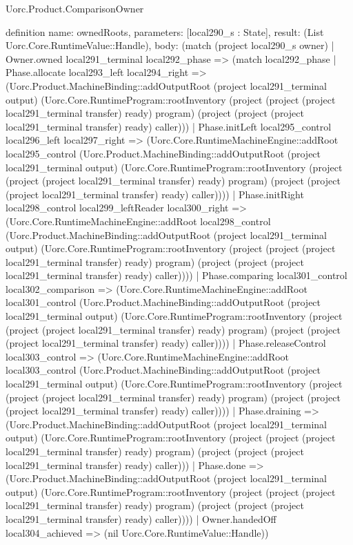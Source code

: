 \begin{lexlean}{Uorc.Product.ComparisonOwner}
\begin{semanticmodule}
definition{
  name: ownedRoots,
  parameters: [local290_s : State],
  result: (List Uorc.Core.RuntimeValue::Handle),
  body: (match (project local290_s owner)
    | Owner.owned local291_terminal local292_phase => (match local292_phase
      | Phase.allocate local293_left local294_right => (Uorc.Product.MachineBinding::addOutputRoot (project local291_terminal output) (Uorc.Core.RuntimeProgram::rootInventory (project (project (project local291_terminal transfer) ready) program) (project (project (project local291_terminal transfer) ready) caller)))
      | Phase.initLeft local295_control local296_left local297_right => (Uorc.Core.RuntimeMachineEngine::addRoot local295_control (Uorc.Product.MachineBinding::addOutputRoot (project local291_terminal output) (Uorc.Core.RuntimeProgram::rootInventory (project (project (project local291_terminal transfer) ready) program) (project (project (project local291_terminal transfer) ready) caller))))
      | Phase.initRight local298_control local299_leftReader local300_right => (Uorc.Core.RuntimeMachineEngine::addRoot local298_control (Uorc.Product.MachineBinding::addOutputRoot (project local291_terminal output) (Uorc.Core.RuntimeProgram::rootInventory (project (project (project local291_terminal transfer) ready) program) (project (project (project local291_terminal transfer) ready) caller))))
      | Phase.comparing local301_control local302_comparison => (Uorc.Core.RuntimeMachineEngine::addRoot local301_control (Uorc.Product.MachineBinding::addOutputRoot (project local291_terminal output) (Uorc.Core.RuntimeProgram::rootInventory (project (project (project local291_terminal transfer) ready) program) (project (project (project local291_terminal transfer) ready) caller))))
      | Phase.releaseControl local303_control => (Uorc.Core.RuntimeMachineEngine::addRoot local303_control (Uorc.Product.MachineBinding::addOutputRoot (project local291_terminal output) (Uorc.Core.RuntimeProgram::rootInventory (project (project (project local291_terminal transfer) ready) program) (project (project (project local291_terminal transfer) ready) caller))))
      | Phase.draining => (Uorc.Product.MachineBinding::addOutputRoot (project local291_terminal output) (Uorc.Core.RuntimeProgram::rootInventory (project (project (project local291_terminal transfer) ready) program) (project (project (project local291_terminal transfer) ready) caller)))
      | Phase.done => (Uorc.Product.MachineBinding::addOutputRoot (project local291_terminal output) (Uorc.Core.RuntimeProgram::rootInventory (project (project (project local291_terminal transfer) ready) program) (project (project (project local291_terminal transfer) ready) caller))))
    | Owner.handedOff local304_achieved => (nil Uorc.Core.RuntimeValue::Handle))
}


\end{semanticmodule}
\end{lexlean}
